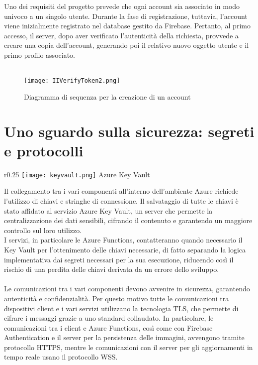 Uno dei requisiti del progetto prevede
che ogni account sia associato in modo univoco a un singolo utente.
Durante la fase di registrazione, tuttavia,
l'account viene inizialmente registrato nel database gestito da Firebase.
Pertanto, al primo accesso, il server, dopo aver verificato l'autenticità della richiesta,
provvede a creare una copia dell'account,
generando poi il relativo nuovo oggetto utente e il primo profilo associato.\\
\\
\begin{figure}[htpb]
    \centering
    \texttt{[image: IIVerifyToken2.png]}
    \caption{Diagramma di sequenza per la creazione di un account}
\end{figure}

\clearpage
\section{Uno sguardo sulla sicurezza: segreti e protocolli}
\begin{wrapfigure}{r}{0.25\textwidth}
    \centering
    \texttt{[image: keyvault.png]}
    Azure Key Vault
\end{wrapfigure}
Il collegamento tra i vari componenti all'interno dell'ambiente Azure
richiede l'utilizzo di chiavi e stringhe di connessione.
Il salvataggio di tutte le chiavi è stato affidato al servizio Azure Key Vault,
un server che permette la centralizzazione dei dati sensibili,
cifrando il contenuto e garantendo un maggiore controllo sul loro utilizzo.\\
I servizi, in particolare le Azure Functions,
contatteranno quando necessario il Key Vault per l'ottenimento delle chiavi necessarie,
di fatto separando la logica implementativa dai segreti necessari per la sua esecuzione,
riducendo così il rischio di una perdita delle chiavi derivata da un errore dello sviluppo.\\
\\
Le comunicazioni tra i vari componenti devono avvenire in sicurezza,
garantendo autenticità e confidenzialità.
Per questo motivo tutte le comunicazioni tra dispositivi client e
i vari servizi utilizzano la tecnologia TLS,
che permette di cifrare i messaggi grazie a uno standard collaudato.
In particolare, le comunicazioni tra i client e Azure Functions,
così come con Firebase Authentication e il server per la persistenza delle immagini,
avvengono tramite protocollo HTTPS,
mentre le comunicazioni con il server per gli aggiornamenti in tempo reale usano il protocollo WSS.\\
